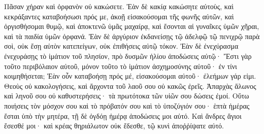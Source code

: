 {Πᾶσαν χήραν καὶ ὀρφανὸν οὐ κακώσετε.
Ἐὰν δὲ κακίᾳ κακώσητε αὐτοὺς, καὶ κεκράξαντες καταβοήσωσι πρός με, ἀκοῇ εἰσακούσομαι τῆς φωνῆς αὐτῶν,
καὶ ὀργισθήσομαι θυμῷ, καὶ ἀποκτενῶ ὑμᾶς μαχαίρᾳ, καὶ ἔσονται αἱ γυναῖκες ὑμῶν χῆραι, καὶ τὰ παιδία ὑμῶν ὀρφανά.
Ἐὰν δὲ ἀργύριον ἐκδανείσῃς τῷ ἀδελφῷ τῷ πενιχρῷ παρὰ σοὶ, οὐκ ἔσῃ αὐτὸν κατεπείγων, οὐκ ἐπιθήσεις αὐτῷ τόκον.
Ἐὰν δὲ ἐνεχύρασμα ἐνεχυράσῃς τὸ ἱμάτιον τοῦ πλησίον, πρὸ δυσμῶν ἡλίου ἀποδώσεις αὐτῷ·
Ἔστι γὰρ τοῦτο περιβόλαιον αὐτοῦ, μόνον τοῦτο τὸ ἱμάτιον ἀσχημοσύνης αὐτοῦ· ἐν τίνι κοιμηθήσεται; Ἐὰν οὖν καταβοήσῃ πρός μέ, εἰσακούσομαι αὐτοῦ· ἐλεήμων γάρ εἰμι.
Θεοὺς οὐ κακολογήσεις, καὶ ἄρχοντα τοῦ λαοῦ σου οὐ κακῶς ἐρεῖς.
Ἀπαρχὰς ἅλωνος καὶ ληνοῦ σου οὐ καθυστερήσεις· τὰ πρωτότοκα τῶν υἱῶν σου δώσεις ἐμοί.
Οὕτω ποιήσεις τὸν μόσχον σου καὶ τὸ πρόβατόν σου καὶ τὸ ὑποζύγιόν σου· ἑπτὰ ἡμέρας ἔσται ὑπὸ τὴν μητέρα, τῇ δὲ ὀγδόῃ ἡμέρᾳ ἀποδώσεις μοι αὐτό.
Καὶ ἄνδρες ἅγιοι ἔσεσθέ μοι· καὶ κρέας θηριάλωτον οὐκ ἔδεσθε, τῷ κυνὶ ἀποῤῥίψατε αὐτό.

}
